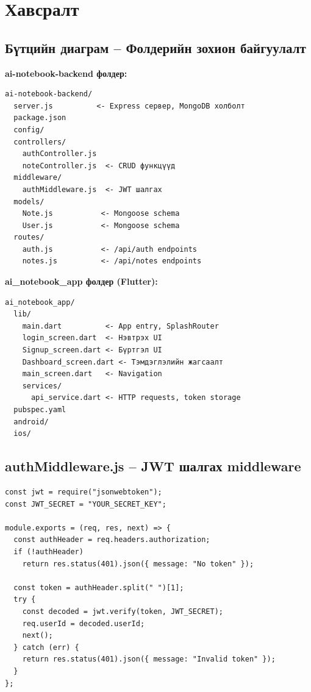 \appendix
\chapter{Хавсралт}
\label{ch:appendix}
\section{Бүтцийн диаграм -- Фолдерийн зохион байгуулалт}

\textbf{ai-notebook-backend фолдер:}
\begin{lstlisting}
ai-notebook-backend/
  server.js          <- Express сервер, MongoDB холболт
  package.json
  config/
  controllers/
    authController.js
    noteController.js  <- CRUD функцүүд
  middleware/
    authMiddleware.js  <- JWT шалгах
  models/
    Note.js           <- Mongoose schema
    User.js           <- Mongoose schema
  routes/
    auth.js           <- /api/auth endpoints
    notes.js          <- /api/notes endpoints
\end{lstlisting}

\textbf{ai\_notebook\_app фолдер (Flutter):}
\begin{lstlisting}
ai_notebook_app/
  lib/
    main.dart          <- App entry, SplashRouter
    login_screen.dart  <- Нэвтрэх UI
    Signup_screen.dart <- Бүртгэл UI
    Dashboard_screen.dart <- Тэмдэглэлийн жагсаалт
    main_screen.dart   <- Navigation
    services/
      api_service.dart <- HTTP requests, token storage
  pubspec.yaml
  android/
  ios/
\end{lstlisting}

\section{authMiddleware.js -- JWT шалгах middleware}

\begin{lstlisting}[caption={middleware/authMiddleware.js}]
const jwt = require("jsonwebtoken");
const JWT_SECRET = "YOUR_SECRET_KEY";

module.exports = (req, res, next) => {
  const authHeader = req.headers.authorization;
  if (!authHeader)
    return res.status(401).json({ message: "No token" });

  const token = authHeader.split(" ")[1];
  try {
    const decoded = jwt.verify(token, JWT_SECRET);
    req.userId = decoded.userId;
    next();
  } catch (err) {
    return res.status(401).json({ message: "Invalid token" });
  }
};
\end{lstlisting}
